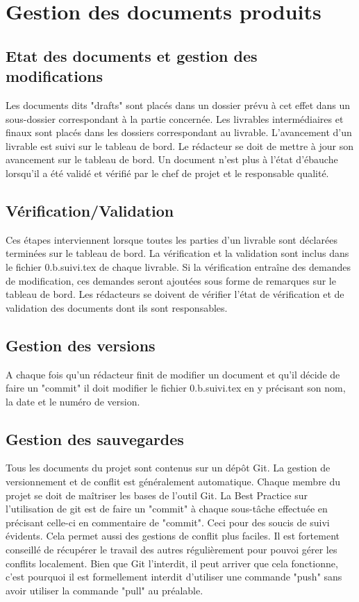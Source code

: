 \section{Gestion des documents produits}
\subsection{Etat des documents et gestion des modifications}
Les documents dits "drafts" sont placés dans un dossier prévu à cet effet dans
un sous-dossier correspondant à la partie concernée. 
Les livrables intermédiaires et finaux sont placés dans les dossiers 
correspondant au livrable.
L'avancement d'un livrable est suivi sur le tableau de bord. Le rédacteur se
doit de mettre à jour son avancement sur le tableau de bord.
Un document n'est plus à l'état d'ébauche lorsqu'il a été validé et vérifié par 
le chef de projet et le responsable qualité.

\subsection{Vérification/Validation}
Ces étapes interviennent lorsque toutes les parties d'un livrable sont 
déclarées terminées sur le tableau de bord.
La vérification et la validation sont inclus dans le fichier 0.b.suivi.tex de 
chaque livrable. Si la vérification entraîne des demandes de modification, 
ces demandes seront ajoutées sous forme de remarques sur le tableau de bord.
Les rédacteurs se doivent de vérifier l'état de vérification et de validation
des documents dont ils sont responsables.

\subsection{Gestion des versions}
A chaque fois qu'un rédacteur finit de modifier un document et qu'il décide 
de faire un "commit" il doit modifier le fichier 0.b.suivi.tex en y précisant 
son nom, la date et le numéro de version.

\subsection{Gestion des sauvegardes}
Tous les documents du projet sont contenus sur un dépôt Git. 
La gestion de versionnement et de conflit est généralement automatique. 
Chaque membre du projet se doit de maîtriser les bases de l'outil Git.
La Best Practice sur l'utilisation de git est de faire un "commit" à chaque 
sous-tâche effectuée en précisant celle-ci en commentaire de "commit". Ceci 
pour des soucis de suivi évidents. Cela permet aussi des gestions de conflit
plus faciles.
Il est fortement conseillé de récupérer le travail des autres régulièrement
pour pouvoi gérer les conflits localement.
Bien que Git l'interdit, il peut arriver que cela fonctionne, c'est pourquoi
il est formellement interdit d'utiliser une commande "push" sans avoir utiliser
la commande "pull" au préalable.
